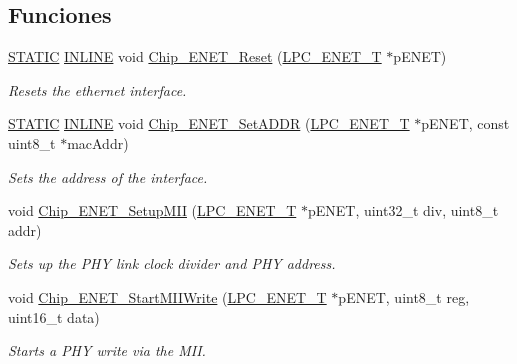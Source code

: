 \subsection*{Funciones}
\begin{DoxyCompactItemize}
\item 
\hyperlink{group___l_p_c___types___public___macros_ga10b2d890d871e1489bb02b7e70d9bdfb}{S\+T\+A\+T\+IC} \hyperlink{spifi__18xx__43xx_8h_a2eb6f9e0395b47b8d5e3eeae4fe0c116}{I\+N\+L\+I\+NE} void \hyperlink{group___e_n_e_t__18_x_x__43_x_x_gae6567d8fb1d427ecf30ce65f48a074b4}{Chip\+\_\+\+E\+N\+E\+T\+\_\+\+Reset} (\hyperlink{struct_l_p_c___e_n_e_t___t}{L\+P\+C\+\_\+\+E\+N\+E\+T\+\_\+T} $\ast$p\+E\+N\+ET)
\begin{DoxyCompactList}\small\item\em Resets the ethernet interface. \end{DoxyCompactList}\item 
\hyperlink{group___l_p_c___types___public___macros_ga10b2d890d871e1489bb02b7e70d9bdfb}{S\+T\+A\+T\+IC} \hyperlink{spifi__18xx__43xx_8h_a2eb6f9e0395b47b8d5e3eeae4fe0c116}{I\+N\+L\+I\+NE} void \hyperlink{group___e_n_e_t__18_x_x__43_x_x_ga6d915db1de0ba98ac0cdb1df8c59515b}{Chip\+\_\+\+E\+N\+E\+T\+\_\+\+Set\+A\+D\+DR} (\hyperlink{struct_l_p_c___e_n_e_t___t}{L\+P\+C\+\_\+\+E\+N\+E\+T\+\_\+T} $\ast$p\+E\+N\+ET, const uint8\+\_\+t $\ast$mac\+Addr)
\begin{DoxyCompactList}\small\item\em Sets the address of the interface. \end{DoxyCompactList}\item 
void \hyperlink{group___e_n_e_t__18_x_x__43_x_x_ga9694421dbd0f331895fcf514fd18c938}{Chip\+\_\+\+E\+N\+E\+T\+\_\+\+Setup\+M\+II} (\hyperlink{struct_l_p_c___e_n_e_t___t}{L\+P\+C\+\_\+\+E\+N\+E\+T\+\_\+T} $\ast$p\+E\+N\+ET, uint32\+\_\+t div, uint8\+\_\+t addr)
\begin{DoxyCompactList}\small\item\em Sets up the P\+HY link clock divider and P\+HY address. \end{DoxyCompactList}\item 
void \hyperlink{group___e_n_e_t__18_x_x__43_x_x_gade9f31bbc04119bc06638fd8ce874f73}{Chip\+\_\+\+E\+N\+E\+T\+\_\+\+Start\+M\+I\+I\+Write} (\hyperlink{struct_l_p_c___e_n_e_t___t}{L\+P\+C\+\_\+\+E\+N\+E\+T\+\_\+T} $\ast$p\+E\+N\+ET, uint8\+\_\+t reg, uint16\+\_\+t data)
\begin{DoxyCompactList}\small\item\em Starts a P\+HY write via the M\+II. \end{DoxyCompactList}\item 

\end{DoxyCompactItemize}
